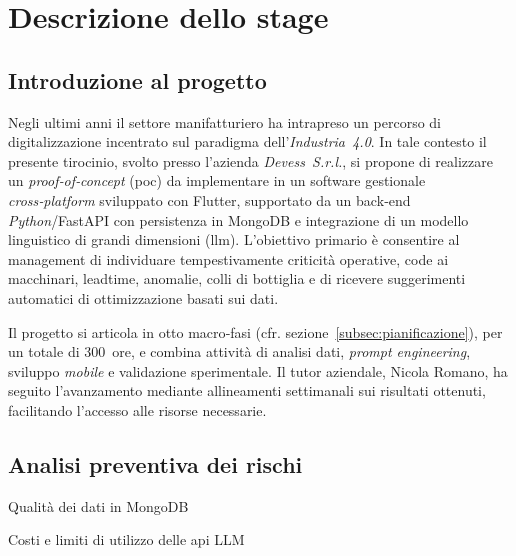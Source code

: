 \chapter{Descrizione dello stage}
\label{chap:descrizione-stage}

\section{Introduzione al progetto}

Negli ultimi anni il settore manifatturiero ha intrapreso un percorso di digitalizzazione incentrato sul paradigma dell’\textit{Industria~4.0}. In tale contesto il presente 
tirocinio, svolto presso l’azienda \textit{Devess~S.r.l.}, si propone di realizzare un \textit{proof‑of‑concept} (\gls{poc}) da implementare in un software gestionale 
\textit{cross‑platform} sviluppato con Flutter, supportato da un back‑end \textit{Python}/FastAPI con persistenza in MongoDB e integrazione di un modello linguistico di grandi 
dimensioni (\gls{llm}). L’obiettivo primario è consentire al management di individuare tempestivamente criticità operative, code ai macchinari, \gls{leadtime}, anomalie, colli di 
bottiglia e di ricevere suggerimenti automatici di ottimizzazione basati sui dati.

Il progetto si articola in otto macro‑fasi (cfr. sezione~\ref{subsec:pianificazione}), per un totale di 300~ore, e combina attività di analisi dati, \textit{prompt engineering}, 
sviluppo \textit{mobile} e validazione sperimentale. Il tutor aziendale, Nicola Romano, ha seguito l’avanzamento mediante allineamenti settimanali sui risultati ottenuti, 
facilitando l’accesso alle risorse necessarie.

\section{Analisi preventiva dei rischi}

\begin{risk}{Qualità dei dati in MongoDB}
\end{risk}

\begin{risk}{Costi e limiti di utilizzo delle \gls{api} LLM}
\end{risk}

